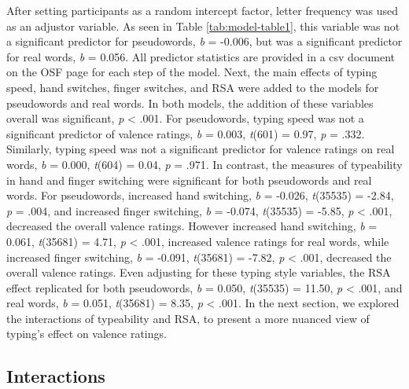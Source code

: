 \documentclass[
  english,
  man,mask]{apa7}
\begin{document}
After setting participants as a random intercept factor, letter frequency was used as an adjustor variable. As seen in Table \ref{tab:model-table1}, this variable was not a significant predictor for pseudowords, \emph{b} = -0.006, but was a significant predictor for real words, \emph{b} = 0.056. All predictor statistics are provided in a csv document on the OSF page for each step of the model. Next, the main effects of typing speed, hand switches, finger switches, and RSA were added to the models for pseudowords and real words. In both models, the addition of these variables overall was significant, \emph{p} \textless{} .001. For pseudowords, typing speed was not a significant predictor of valence ratings, \emph{b} = 0.003, \emph{t}(601) = 0.97, \emph{p} = .332. Similarly, typing speed was not a significant predictor for valence ratings on real words, \emph{b} = 0.000, \emph{t}(604) = 0.04, \emph{p} = .971. In contrast, the measures of typeability in hand and finger switching were significant for both pseudowords and real words. For pseudowords, increased hand switching, \emph{b} = -0.026, \emph{t}(35535) = -2.84, \emph{p} = .004, and increased finger switching, \emph{b} = -0.074, \emph{t}(35535) = -5.85, \emph{p} \textless{} .001, decreased the overall valence ratings. However increased hand switching, \emph{b} = 0.061, \emph{t}(35681) = 4.71, \emph{p} \textless{} .001, increased valence ratings for real words, while increased finger switching, \emph{b} = -0.091, \emph{t}(35681) = -7.82, \emph{p} \textless{} .001, decreased the overall valence ratings. Even adjusting for these typing style variables, the RSA effect replicated for both pseudowords, \emph{b} = 0.050, \emph{t}(35535) = 11.50, \emph{p} \textless{} .001, and real words, \emph{b} = 0.051, \emph{t}(35681) = 8.35, \emph{p} \textless{} .001. In the next section, we explored the interactions of typeability and RSA, to present a more nuanced view of typing's effect on valence ratings.

\hypertarget{interactions}{%
\subsection{Interactions}\label{interactions}}
\end{document}
